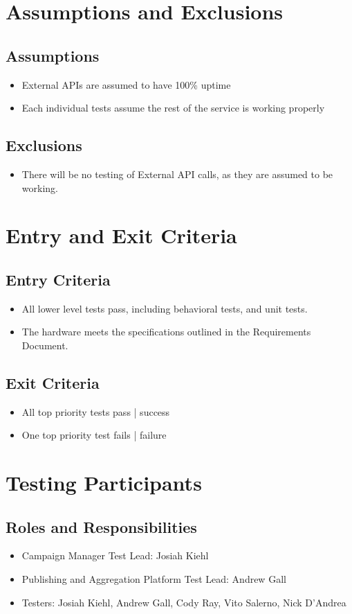 \documentclass[12pt]{article}
\begin{document}
\section{Assumptions and Exclusions}
\subsection{Assumptions}
\begin{itemize}
\item External APIs are assumed to have 100\% uptime
\item Each individual tests assume the rest of the service is working properly
\end{itemize}
\subsection{Exclusions}
\begin{itemize}
\item There will be no testing of External API calls, as they are assumed to be working.
\end{itemize}
\section{Entry and Exit Criteria}
\subsection{Entry Criteria}
\begin{itemize}
\item All lower level tests pass, including behavioral tests, and unit tests.
\item The hardware meets the specifications outlined in the Requirements Document.
\end{itemize}
\subsection{Exit Criteria}
\begin{itemize}
  \item All top priority tests pass | success
  \item One top priority test fails | failure
\end{itemize}

\section{Testing Participants}
\subsection{Roles and Responsibilities}
\begin{itemize}
\item Campaign Manager Test Lead: Josiah Kiehl
\item Publishing and Aggregation Platform Test Lead: Andrew Gall
\item Testers: Josiah Kiehl, Andrew Gall, Cody Ray, Vito Salerno, Nick D'Andrea
\end{itemize}
\end{document}
